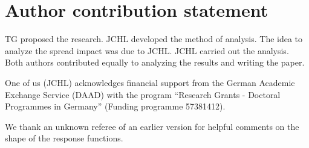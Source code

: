 \section{Author contribution statement}

TG proposed the research. JCHL developed the method of analysis. The idea to
analyze the spread impact was due to JCHL. JCHL carried out the analysis. Both
authors contributed equally to analyzing the results and writing the paper.

    One of us (JCHL) acknowledges financial support from the German Academic
    Exchange Service (DAAD) with the program ``Research Grants - Doctoral
    Programmes in Germany'' (Funding programme 57381412).

    We thank an unknown referee of an earlier version for helpful comments on
    the shape of the response functions.

